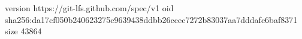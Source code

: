 version https://git-lfs.github.com/spec/v1
oid sha256:da17cf050b240623275c9639438ddbb26ccec7272b83037aa7dddafc6baf8371
size 43864
